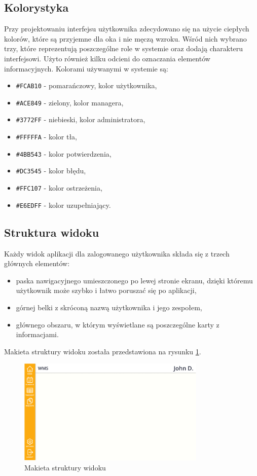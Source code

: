 \subsection{Kolorystyka}

Przy projektowaniu interfejsu użytkownika zdecydowano się na użycie ciepłych kolorów, które są przyjemne dla oka i nie męczą wzroku. Wśród nich wybrano trzy, które reprezentują poszczególne role w systemie oraz dodają charakteru interfejsowi. Użyto również kilku odcieni do oznaczania elementów informacyjnych. Kolorami używanymi w systemie są:
\begin{itemize}
    \item \texttt{\#FCAB10} - pomarańczowy, kolor użytkownika,
    \item \texttt{\#ACE849} - zielony, kolor managera,
    \item \texttt{\#3772FF} - niebieski, kolor administratora,
    \item \texttt{\#FFFFFA} - kolor tła,
    \item \texttt{\#4BB543} - kolor potwierdzenia,
    \item \texttt{\#DC3545} - kolor błędu,
    \item \texttt{\#FFC107} - kolor ostrzeżenia,
    \item \texttt{\#E6EDFF} - kolor uzupełniający.
\end{itemize}

\subsection{Struktura widoku}

Każdy widok aplikacji dla zalogowanego użytkownika składa się z trzech głównych elementów:
\begin{itemize}
    \item paska nawigacyjnego umieszczonego po lewej stronie ekranu, dzięki któremu użytkownik może szybko i łatwo poruszać się po aplikacji,
    \item górnej belki z skróconą nazwą użytkownika i jego zespołem,
    \item głównego obszaru, w którym wyświetlane są poszczególne karty z informacjami.
\end{itemize}

Makieta struktury widoku została przedstawiona na rysunku \ref{fig:layout}.

\begin{figure}[H]
    \centering
    \includegraphics[width=0.8\textwidth, frame]{graf/front/layoutMockup.png}
    \caption{Makieta struktury widoku}
    \label{fig:layout}
\end{figure}

